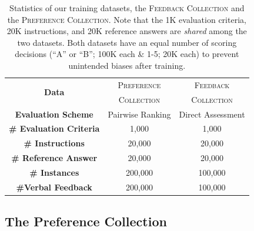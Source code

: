 \documentclass[11pt]{article}
\begin{document}
\begin{table}[t]
\centering
\fontsize{7.5}{10}\selectfont
{
\begin{tabular}{ccc}
\toprule
\multirow{2}{*}{\textbf{Data}} & \textsc{Preference} & \textsc{Feedback}\\
&\textsc{Collection} & \textsc{Collection}\\
\midrule
\textbf{Evaluation Scheme} & Pairwise Ranking & Direct Assessment\\
\textbf{\# Evaluation Criteria} & 1,000 & 1,000\\
\textbf{\# Instructions} & 20,000 & 20,000 \\
\textbf{\# Reference Answer} & 20,000 & 20,000\\
\textbf{\# Instances} & 200,000 & 100,000\\
\textbf{\#Verbal Feedback} & 200,000 & 100,000\\
\bottomrule
\end{tabular}%
}

\caption{Statistics of our training datasets, the \textsc{Feedback Collection} and the \textsc{Preference Collection}. Note that the 1K evaluation criteria, 20K instructions, and 20K reference answers are \textit{shared } among the two datasets. Both datasets have an equal number of scoring decisions (``A'' or ``B''; 100K each \& 1-5; 20K each) to prevent unintended biases after training.}
\label{tab:train-sets}
\end{table}


\subsection{The Preference Collection}\label{preference_collection}
\end{document}
